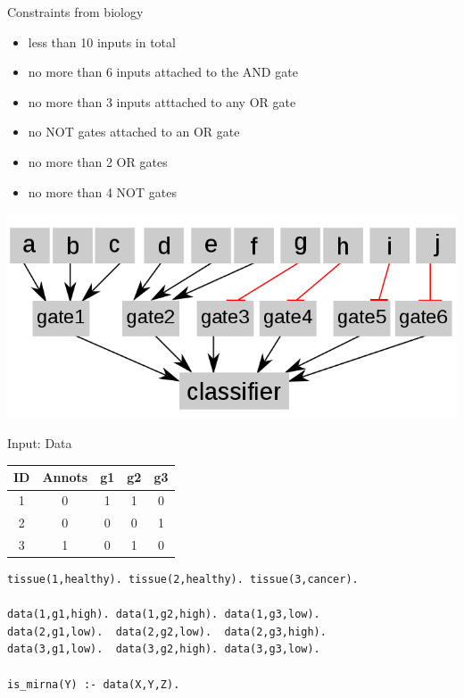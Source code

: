 \documentclass[10pt,dvipsnames]{beamer}
\begin{document}
\begin{frame}{Constraints from biology}
\begin{itemize}
\item less than 10 inputs in total
\item no more than 6 inputs attached to the AND gate
\item no more than 3 inputs atttached to any OR gate
\item no NOT gates attached to an OR gate
\item no more than 2 OR gates
\item no more than 4 NOT gates
\end{itemize}
\begin{center}
\includegraphics[scale=0.3]{classifier_max.png}
\end{center}
\end{frame}


\begin{frame}[fragile]{Input: Data}
\begin{center}
\begin{tabular}{|c|c|c|c|c|}
\hline
ID&	Annots&	g1&	g2&	g3\\
\hline
1&	0&	1&	1&	0\\
2&	0&	0&	0&	1\\
3&	1&	0&	1&	0\\
\hline
\end{tabular}
\end{center}
\vspace{0.2cm}
\begin{verbatim}
tissue(1,healthy). tissue(2,healthy). tissue(3,cancer).
 
data(1,g1,high). data(1,g2,high). data(1,g3,low).
data(2,g1,low).  data(2,g2,low).  data(2,g3,high).
data(3,g1,low).  data(3,g2,high). data(3,g3,low).
 
is_mirna(Y) :- data(X,Y,Z).
\end{verbatim}
\end{frame}
\end{document}
